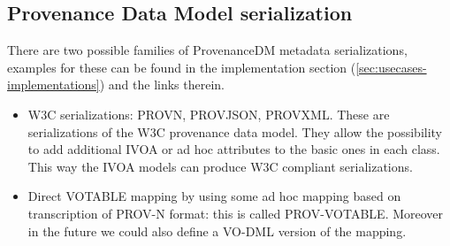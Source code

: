 \subsection{Provenance Data Model serialization}
There are two possible families of ProvenanceDM metadata serializations, examples for these can be found in the implementation section (\ref{sec:usecases-implementations}) and the links therein.
\begin{itemize}
 \item W3C serializations: PROV\-N, PROV\-JSON, PROV\-XML. These are serializations of the W3C provenance data model. They allow the possibility to add additional IVOA or ad hoc attributes to the basic ones in each class. This way the IVOA models can produce W3C compliant serializations.


 \item Direct VOTABLE mapping by using some ad hoc mapping based on transcription of PROV-N format: this is called PROV-VOTABLE. Moreover in the future we could also define a VO-DML \citep{std:VODML} version of the mapping.

\end{itemize}

